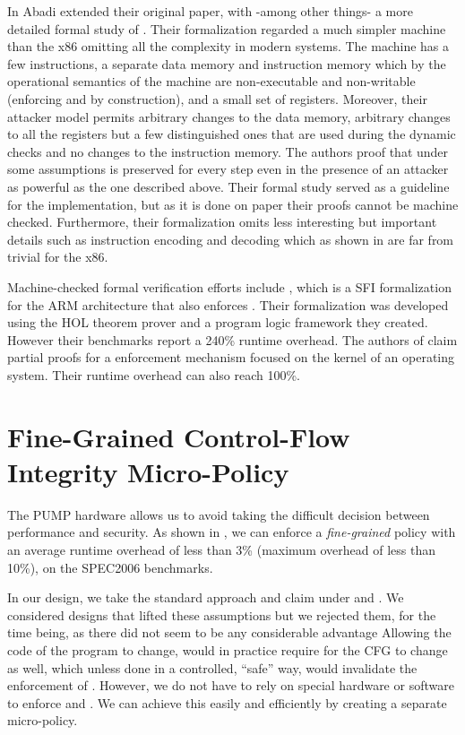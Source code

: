 In \cite{AbadiBEL09} Abadi \ETAL extended their original paper, with
-among other things- a more detailed formal study of \CFI. Their formalization
regarded a much simpler machine than the x86 omitting all the complexity in
modern systems. The machine has a few instructions, a separate data memory and
instruction memory which by the operational semantics of the machine are 
non-executable and non-writable (enforcing \NXD and \NWC by construction), and a
small set of registers.
Moreover, their attacker model permits arbitrary changes to the data memory,
arbitrary changes to all the registers but a few distinguished ones that are
used during the dynamic checks and no changes to the instruction memory.
The authors proof that under some assumptions \CFI is preserved for every step
even in the presence of an attacker as powerful as the one described above. 
Their formal study served as a guideline for the implementation, but as it is 
done on paper their proofs cannot be machine checked. Furthermore, their 
formalization omits less interesting but important details such as instruction 
encoding and decoding which as shown in \cite{MorrisettTTTG12} are far from 
trivial for the x86.

Machine-checked formal verification efforts include \cite{ZhaoLSR11}, which is
a SFI formalization for the ARM architecture that also enforces \CFI.
Their formalization was developed using the HOL theorem prover and a program
logic framework they created. However their benchmarks report a 240\% runtime
overhead. The authors of \cite{CriswellDA14} claim partial proofs for a \CFI
enforcement mechanism focused on the kernel of an operating system. Their
runtime overhead can also reach 100\%.

\section{Fine-Grained Control-Flow Integrity Micro-Policy}\label{sec:cfi_fine}

The PUMP hardware allows us to avoid taking the difficult decision between
performance and security. As shown in \cite{pump_asplos2015}, we can enforce a
\emph{fine-grained} \CFI policy with an average runtime overhead of less than 3\%
(maximum overhead of less than 10\%), on the SPEC2006 benchmarks.

In our design, we take the standard approach and claim \CFI under \NXD and
\NWC{}.
We considered designs that lifted these assumptions but
we rejected them, for the time being, as there did not seem to be any
considerable advantage  Allowing the code of the program to change, would in
practice require for the CFG to change as well, which unless done in
a controlled, ``safe'' way, would invalidate the enforcement of \CFI.
However, we do not have to rely on special hardware or software to enforce
\NXD and \NWC. We can achieve this easily and efficiently by
creating a separate micro-policy.


